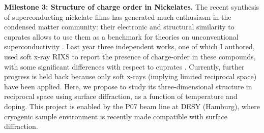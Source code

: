 \documentclass[a4paper, 12pt]{article}
\begin{document}
\medskip 

{\bfseries Milestone 3: Structure of charge order in Nickelates.}
The recent synthesis of superconducting nickelate films has generated much enthusiasm in the condensed matter community: their electronic and structural similarity to cuprates allows to use them as a benchmark for theories on unconventional superconductivity \cite{li2019superconductivity}. Last year three independent works, one of which I authored, used soft x-ray RIXS to report the presence of charge-order in these compounds, with some significant differences with respect to cuprates \cite{krieger2022charge, rossi2022broken, tam2022charge}. Currently, further progress is held back because only soft x-rays (implying limited reciprocal space) have been applied. Here, we propose to study its three-dimensional structure in reciprocal space using surface diffraction, as a function of temperature and doping. This project is enabled by the P07 beam line at DESY (Hamburg), where cryogenic sample environment is recently made compatible with surface diffraction. 

\medskip
\end{document}
